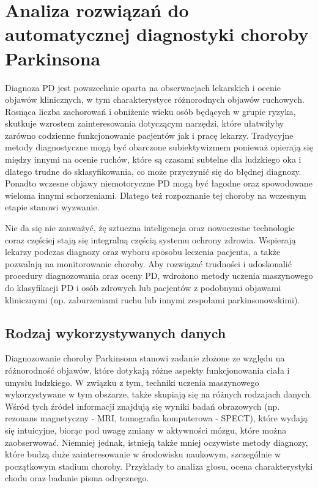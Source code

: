 \chapter{Analiza rozwiązań do automatycznej diagnostyki choroby Parkinsona}\label{ch:analiza-rozwiazan}


Diagnoza PD jest powszechnie oparta na obserwacjach lekarskich i ocenie objawów klinicznych, w tym charakterystyce różnorodnych objawów ruchowych.
Rosnąca liczba zachorowań i obniżenie wieku osób będących w grupie ryzyka, skutkuje wzrostem zainteresowania dotyczącym narzędzi, które ułatwiłyby
zarówno codzienne funkcjonowanie pacjentów jak i pracę lekarzy.
Tradycyjne metody diagnostyczne mogą być obarczone subiektywizmem ponieważ opierają się między innymi na ocenie ruchów, które są czasami subtelne dla
ludzkiego oka i dlatego trudne do sklasyfikowania, co może przyczynić się do błędnej diagnozy.
Ponadto wczesne objawy niemotoryczne PD mogą być łagodne oraz spowodowane wieloma innymi schorzeniami.
Dlatego też rozpoznanie tej choroby na wczesnym etapie stanowi wyzwanie.

Nie da się nie zauważyć, żę sztuczna inteligencja oraz nowoczesne technologie coraz częściej stają się integralną częścią systemu ochrony zdrowia.
Wspierają lekarzy podczas diagnozy oraz wyboru sposobu leczenia pacjenta, a także pozwalają na monitorowanie choroby.
Aby rozwiązać trudności i udoskonalić procedury diagnozowania oraz oceny PD, wdrożono metody uczenia maszynowego do klasyfikacji PD i osób zdrowych lub
pacjentów z podobnymi objawami klinicznymi (np. zaburzeniami ruchu lub innymi zespołami parkinsonowskimi).


\section{Rodzaj wykorzystywanych danych}\label{sec:dane-przeglad}

Diagnozowanie choroby Parkinsona stanowi zadanie złożone ze względu na różnorodność objawów, które dotykają różne aspekty
funkcjonowania ciała i umysłu ludzkiego.
W związku z tym, techniki uczenia maszynowego wykorzystywane w tym obszarze, także skupiają się na różnych rodzajach danych.
Wśród tych źródeł informacji znajdują się wyniki badań obrazowych (np. rezonans magnetyczny - MRI, tomografia komputerowa - SPECT),
które wydają się intuicyjne, biorąc pod uwagę zmiany w aktywności mózgu, które można zaobserwować.
Niemniej jednak, istnieją także mniej oczywiste metody diagnozy, które budzą duże zainteresowanie w środowisku naukowym, szczególnie w początkowym stadium choroby.
Przykłady to analiza głosu, ocena charakterystyki chodu oraz badanie pisma odręcznego.

